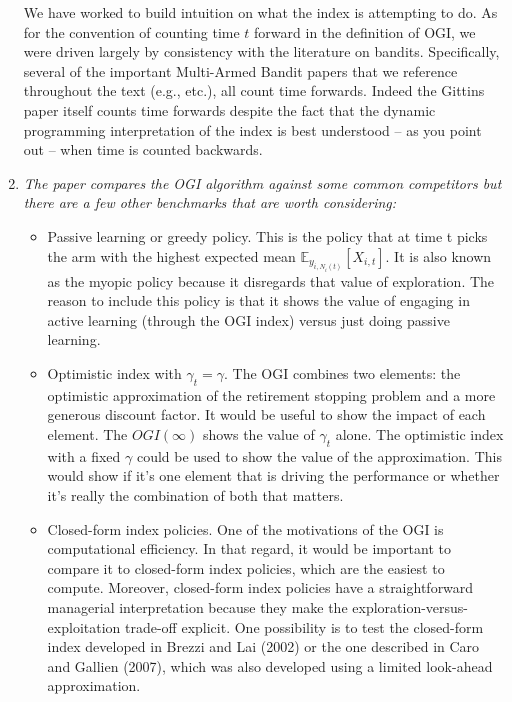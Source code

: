 \documentclass[11pt]{article}
\newcommand{\1}{\ensuremath{\mathbf{1}}} %
\theoremstyle{thm-sf}
\begin{document}
\begin{enumerate}
		We have worked to build intuition on what the index is attempting to do. As for the convention of counting time $t$ forward in the definition of OGI,  we were driven largely by consistency with the literature on bandits. Specifically, several of the important Multi-Armed Bandit papers that we reference throughout the text (e.g., \cite{lai1985asymptotically,auer2002finite,gittins1979bandit} etc.), all count time forwards. Indeed the Gittins paper itself counts time forwards despite the fact that the dynamic programming interpretation of the index is best understood -- as you point out -- when time is counted backwards. 
	
		\item {\it The paper compares the OGI algorithm against some common competitors but there are a few other benchmarks that are worth considering:
		\begin{itemize}
			\item Passive learning or greedy policy. This is the policy that at time t picks the arm with the highest expected mean $\mathbb E_{y_{i, N_i(t)}}[X_{i,t}]$. It is also known as the myopic policy because it disregards that value of exploration. The reason to include this policy is that it shows the value of engaging in active learning (through the OGI index) versus just doing passive learning.
			
			\item Optimistic index with $\gamma_t = \gamma$. The OGI combines two elements: the optimistic approximation of the retirement stopping problem and a more generous discount factor. It would be useful to show the impact of each element. The $OGI(\infty)$ shows the value of $\gamma_t$ alone. The optimistic index with a fixed $\gamma$ could be used to show the value of the approximation. This would show if it's one element that is driving the performance or whether it's really the combination of both that matters.
			
			\item Closed-form index policies. One of the motivations of the OGI is computational efficiency. In that regard, it would be important to compare it to closed-form index policies, which are the easiest to compute. Moreover, closed-form index policies have a straightforward managerial interpretation because they make the exploration-versus- exploitation trade-off explicit. One possibility is to test the closed-form index developed in Brezzi and Lai (2002) or the one described in Caro and Gallien (2007), which was also developed using a limited look-ahead approximation.
	\end{itemize}}
	

\end{enumerate}
\end{document}
